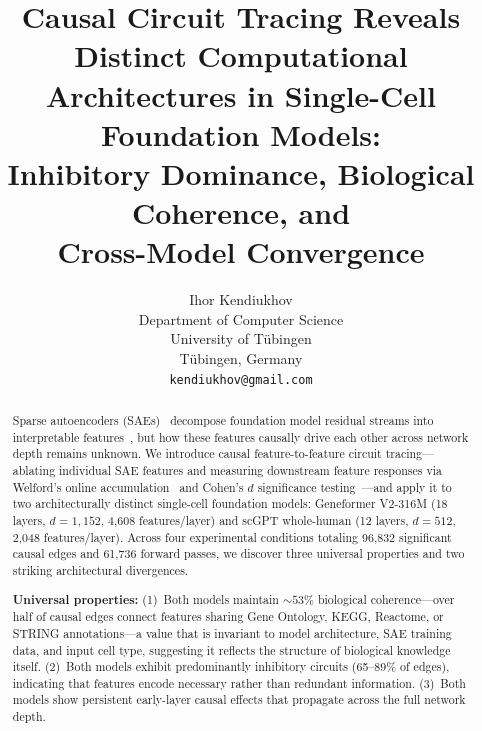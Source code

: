 \documentclass[onecolumn]{article}
\title{\textbf{Causal Circuit Tracing Reveals Distinct Computational\\Architectures in Single-Cell Foundation Models:\\Inhibitory Dominance, Biological Coherence, and\\Cross-Model Convergence}}
\author{Ihor Kendiukhov\\
Department of Computer Science\\
University of T\"ubingen\\
T\"ubingen, Germany\\
\texttt{kendiukhov@gmail.com}}
\date{}
\begin{document}
\maketitle

\begin{abstract}
Sparse autoencoders (SAEs)~\citep{cunningham2023sparse,bricken2023monosemanticity,gao2024scaling} decompose foundation model residual streams into interpretable features~\citep{templeton2024scaling,elhage2022superposition}, but how these features causally drive each other across network depth remains unknown. We introduce causal feature-to-feature circuit tracing---ablating individual SAE features and measuring downstream feature responses via Welford's online accumulation~\citep{welford1962note} and Cohen's $d$ significance testing~\citep{cohen1988statistical}---and apply it to two architecturally distinct single-cell foundation models: Geneformer V2-316M (18 layers, $d{=}1{,}152$, 4,608 features/layer) and scGPT whole-human (12 layers, $d{=}512$, 2,048 features/layer). Across four experimental conditions totaling 96,832 significant causal edges and 61,736 forward passes, we discover three universal properties and two striking architectural divergences.

\textbf{Universal properties:} (1)~Both models maintain ${\sim}53\%$ biological coherence---over half of causal edges connect features sharing Gene Ontology, KEGG, Reactome, or STRING annotations---a value that is invariant to model architecture, SAE training data, and input cell type, suggesting it reflects the structure of biological knowledge itself. (2)~Both models exhibit predominantly inhibitory circuits (65--89\% of edges), indicating that features encode necessary rather than redundant information. (3)~Both models show persistent early-layer causal effects that propagate across the full network depth.


\end{abstract}
\end{document}
